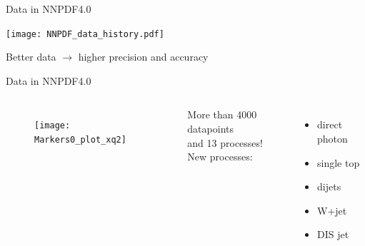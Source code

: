 \begin{frame}[t]{Data in NNPDF4.0}
  \begin{center}
    \texttt{[image: NNPDF\_data\_history.pdf]}
  \end{center}
  Better data $\rightarrow$ higher precision and accuracy
\end{frame}


\begin{frame}{Data in NNPDF4.0}
  \begin{columns}
          \begin{figure}
              \texttt{[image: Markers0\_plot\_xq2]}
          \end{figure}

          \vspace*{2em}
          More than 4000 datapoints\\
          and 13 processes!\\
          \vspace*{1em}
          New processes:
          \begin{itemize}
              \item direct photon
              \item single top
              \item dijets
              \item W+jet
              \item DIS jet
          \end{itemize}
  \end{columns}
\end{frame}

